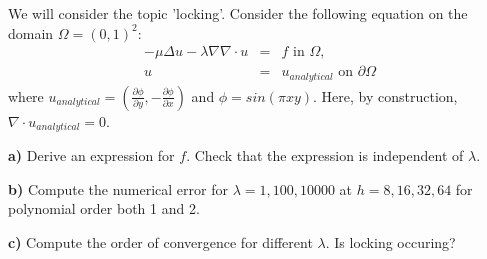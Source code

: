\begin{exercise}
\label{ex:lock}
We will consider the topic 'locking'. 
Consider the following equation on the domain $\Omega=(0,1)^2$: 
\begin{eqnarray}
-\mu \Delta u - \lambda \nabla \nabla \cdot u   &=& f \mbox{ in } \Omega, \\ 
        u &=& u_{analytical} \mbox{ on } \partial \Omega
\end{eqnarray}
where $u_{analytical}= (\frac{\partial \phi}{\partial y}, -\frac{\partial \phi}{\partial x})$ 
and $\phi= sin(\pi x y)$. Here, by construction, 
$\nabla \cdot u_{analytical} = 0$.  

\noindent
\textbf{a)} 
Derive an expression for $f$. Check that the expression is independent of $\lambda$. 

\noindent
\textbf{b)} 
Compute the numerical error for $\lambda=1, 100, 10000$
at $h=8, 16, 32, 64$ for polynomial order both 1 and 2.  

\noindent
\textbf{c)} 
Compute the order of convergence for different $\lambda$. 
Is locking occuring?

\end{exercise}
